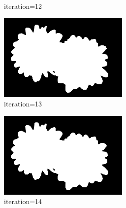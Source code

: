 \documentclass{article}
\begin{document}
\begin{figure}[t]
\begin{subfigure}[t]{0.19\textwidth}
\vspace{-0.6cm}
\caption{iteration=12}
\end{subfigure}
\begin{subfigure}[t]{0.19\textwidth}
\centering
\includegraphics[width=\textwidth]{./images/marginals_iter_13.png}
\vspace{-0.6cm}
\caption{iteration=13}
\end{subfigure}
\begin{subfigure}[t]{0.19\textwidth}
\centering
\includegraphics[width=\textwidth]{./images/marginals_iter_14.png}
\vspace{-0.6cm}
\caption{iteration=14}
\end{subfigure}
\begin{subfigure}[t]{0.19\textwidth}
\centering

\end{subfigure}
\end{figure}
\end{document}
